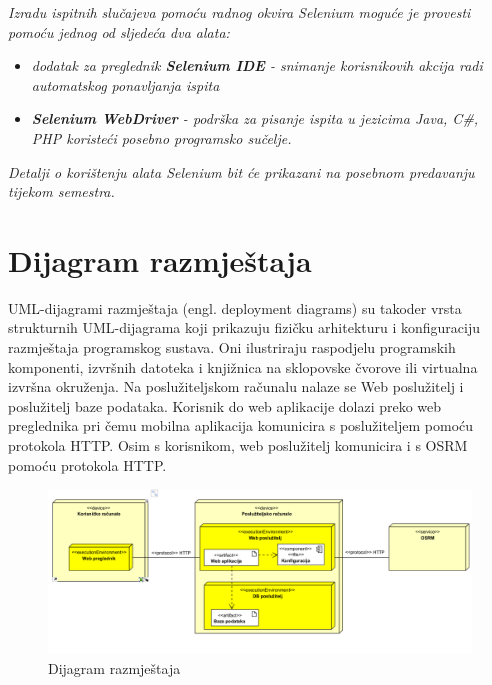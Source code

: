 \textit{Izradu ispitnih slučajeva pomoću radnog okvira Selenium moguće je provesti pomoću jednog od sljedeća dva alata:}
\begin{itemize}
	\item \textit{dodatak za preglednik \textbf{Selenium IDE} - snimanje korisnikovih akcija radi automatskog ponavljanja ispita	}
	\item \textit{\textbf{Selenium WebDriver} - podrška za pisanje ispita u jezicima Java, C\#, PHP koristeći posebno programsko sučelje.}
\end{itemize}
\textit{Detalji o korištenju alata Selenium bit će prikazani na posebnom predavanju tijekom semestra.}

\eject 


\section{Dijagram razmještaja}


UML-dijagrami razmještaja (engl. deployment diagrams) su takoder vrsta strukturnih UML-dijagrama koji prikazuju fizičku arhitekturu i konfiguraciju razmještaja programskog sustava. Oni ilustriraju raspodjelu programskih komponenti, izvršnih datoteka i knjižnica na sklopovske čvorove ili virtualna izvršna okruženja.
Na poslužiteljskom računalu nalaze se Web poslužitelj i poslužitelj baze podataka. Korisnik do web aplikacije dolazi preko web preglednika pri čemu mobilna aplikacija komunicira s poslužiteljem pomoću protokola HTTP. Osim s korisnikom, web poslužitelj komunicira i s OSRM pomoću protokola HTTP.

\vspace{5cm}

\begin{figure}[H]
	\includegraphics[width=\textwidth]{slike/dijagram_razmjestaja.png} %
	\centering
	\caption{Dijagram razmještaja}
	\label{fig:dijagramaktivnosti}
\end{figure}
\eject 

